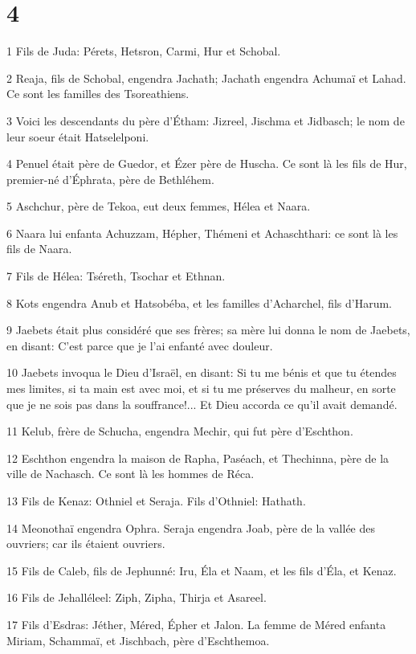 \chapter{4}

\par 1 Fils de Juda: Pérets, Hetsron, Carmi, Hur et Schobal.
\par 2 Reaja, fils de Schobal, engendra Jachath; Jachath engendra Achumaï et Lahad. Ce sont les familles des Tsoreathiens.
\par 3 Voici les descendants du père d'Étham: Jizreel, Jischma et Jidbasch; le nom de leur soeur était Hatselelponi.
\par 4 Penuel était père de Guedor, et Ézer père de Huscha. Ce sont là les fils de Hur, premier-né d'Éphrata, père de Bethléhem.
\par 5 Aschchur, père de Tekoa, eut deux femmes, Hélea et Naara.
\par 6 Naara lui enfanta Achuzzam, Hépher, Thémeni et Achaschthari: ce sont là les fils de Naara.
\par 7 Fils de Hélea: Tséreth, Tsochar et Ethnan.
\par 8 Kots engendra Anub et Hatsobéba, et les familles d'Acharchel, fils d'Harum.
\par 9 Jaebets était plus considéré que ses frères; sa mère lui donna le nom de Jaebets, en disant: C'est parce que je l'ai enfanté avec douleur.
\par 10 Jaebets invoqua le Dieu d'Israël, en disant: Si tu me bénis et que tu étendes mes limites, si ta main est avec moi, et si tu me préserves du malheur, en sorte que je ne sois pas dans la souffrance!... Et Dieu accorda ce qu'il avait demandé.
\par 11 Kelub, frère de Schucha, engendra Mechir, qui fut père d'Eschthon.
\par 12 Eschthon engendra la maison de Rapha, Paséach, et Thechinna, père de la ville de Nachasch. Ce sont là les hommes de Réca.
\par 13 Fils de Kenaz: Othniel et Seraja. Fils d'Othniel: Hathath.
\par 14 Meonothaï engendra Ophra. Seraja engendra Joab, père de la vallée des ouvriers; car ils étaient ouvriers.
\par 15 Fils de Caleb, fils de Jephunné: Iru, Éla et Naam, et les fils d'Éla, et Kenaz.
\par 16 Fils de Jehalléleel: Ziph, Zipha, Thirja et Asareel.
\par 17 Fils d'Esdras: Jéther, Méred, Épher et Jalon. La femme de Méred enfanta Miriam, Schammaï, et Jischbach, père d'Eschthemoa.

